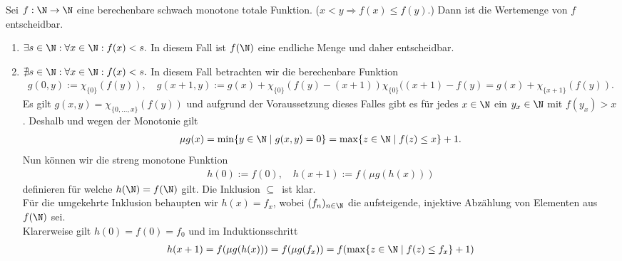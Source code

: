 
\begin{exercise}[215]

\phantom{}

	Sei $f:\N \to \N$ eine berechenbare schwach monotone totale Funktion. ($x < y \Rightarrow f(x) \leq f(y)$.) Dann ist die Wertemenge von $f$ entscheidbar.

\end{exercise}


\begin{solution}

\phantom{}

	\begin{enumerate}[label = Fall \arabic*:]
		\item $\exists s \in \N: \forall x \in \N: f(x) < s.$ In diesem Fall ist $f(\N)$ eine endliche Menge und daher entscheidbar.
		\item $\nexists s \in \N: \forall x \in \N: f(x) < s.$ In diesem Fall betrachten wir die berechenbare Funktion
			\begin{align*}
			g(0,y) := \chi_{\{0\}}(f(y)), \quad g(x + 1, y) := g(x) + \chi_{\{0\}}(f(y) - (x + 1)) \chi_{\{0\}}((x + 1) - f(y) = g(x) + \chi_{\{x+1\}}(f(y)).
			\end{align*}
			Es gilt $g(x,y) = \chi_{\{0, \dots, x\}}(f(y))$ und aufgrund der Voraussetzung dieses Falles gibt es für jedes $x \in \N$ ein $y_x \in \N$ mit $f(y_x) > x$. Deshalb und wegen der Monotonie gilt
			\begin{align*}
			\mu g(x) = \min\{y \in \N \mid g(x,y) = 0\} = \max\{z \in \N \mid f(z) \leq x\} + 1.
			\end{align*}
			Nun können wir die streng monotone Funktion
			\begin{align*}
			h(0) := f(0), \quad h(x + 1) := f(\mu g(h(x)))
			\end{align*}
			definieren für welche $h(\N) = f(\N)$ gilt. Die Inklusion \glqq$\subseteq$\grqq\ ist klar. \\
			Für die umgekehrte Inklusion behaupten wir $h(x) = f_x$, wobei $(f_n)_{n \in \N}$
			die aufsteigende, injektive Abzählung von Elementen aus $f(\N)$ sei. \\
			Klarerweise gilt $h(0) = f(0) = f_0$ und im Induktionsschritt
			\begin{align*}
				h(x + 1) = f(\mu g(h(x))) = f(\mu g(f_x)) = f(\max\{z \in \N \mid f(z) \leq f_x\} + 1)

\end{align*}
\end{enumerate}
\end{solution}
